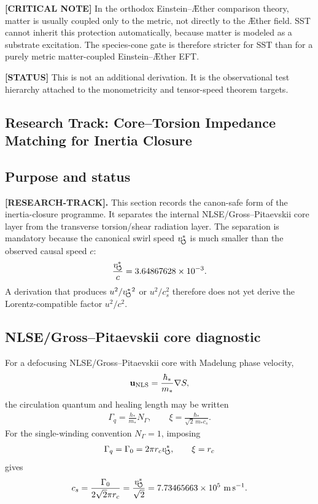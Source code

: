 \textbf{[CRITICAL NOTE]} In the orthodox Einstein--\AE ther comparison theory,
matter is usually coupled only to the metric, not directly to the \AE ther field.
SST cannot inherit this protection automatically, because matter is modeled as a
substrate excitation. The species-cone gate is therefore stricter for SST than
for a purely metric matter-coupled Einstein--\AE ther EFT.

\textbf{[STATUS]} This is not an additional derivation. It is the observational
test hierarchy attached to the monometricity and tensor-speed theorem targets.


\subsection{Research Track: Core--Torsion Impedance Matching for Inertia Closure}
\label{sec:rt_core_torsion_impedance_matching}

\subsection{Purpose and status}

\textbf{[RESEARCH-TRACK].}
This section records the canon-safe form of the inertia-closure programme. It separates the internal NLSE/Gross--Pitaevskii core layer from the transverse torsion/shear radiation layer. The separation is mandatory because the canonical swirl speed \(v_{\!\boldsymbol{\circlearrowleft}}^{\ast}\) is much smaller than the observed causal speed \(c\):
\begin{align}
    \frac{v_{\!\boldsymbol{\circlearrowleft}}^{\ast}}{c}=3.64867628\times10^{-3}.
\end{align}
A derivation that produces \(u^2/v_{\!\boldsymbol{\circlearrowleft}}^{\ast}{}^2\) or \(u^2/c_s^2\) therefore does not yet derive the Lorentz-compatible factor \(u^2/c^2\).

\subsection{NLSE/Gross--Pitaevskii core diagnostic}

For a defocusing NLSE/Gross--Pitaevskii core with Madelung phase velocity,
\begin{align}
    \mathbf u_{\rm NLS}=\frac{\hbar_*}{m_*}\nabla S,
\end{align}
the circulation quantum and healing length may be written
\begin{align}
    \Gamma_q = \frac{h_*}{m_*}N_\Gamma,
    \qquad
    \xi = \frac{\hbar_*}{\sqrt{2}\,m_*c_s}.
\end{align}
For the single-winding convention \(N_\Gamma=1\), imposing
\begin{align}
    \Gamma_q=\Gamma_0=2\pi r_cv_{\!\boldsymbol{\circlearrowleft}}^{\ast},
    \qquad
    \xi=r_c
\end{align}
gives
\begin{align}
    c_s
    =
    \frac{\Gamma_0}{2\sqrt{2}\pi r_c}
    =
    \frac{v_{\!\boldsymbol{\circlearrowleft}}^{\ast}}{\sqrt{2}}
    =
    7.73465663\times10^{5}\ \mathrm{m\,s^{-1}}.
    \label{eq:rt_core_torsion_cs}
\end{align}

